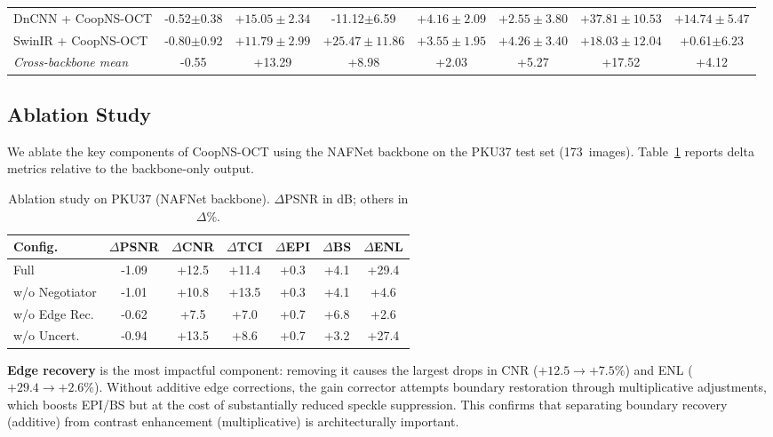 \documentclass{ieeetj}
\begin{document}
\begin{table}[t]
{\begin{tabular}{lccccccc}
DnCNN + CoopNS-OCT & -0.52${\pm}$0.38 & $\mathbf{+15.05{\pm}2.34}$ & -11.12${\pm}$6.59 & $\mathbf{+4.16{\pm}2.09}$ & $\mathbf{+2.55{\pm}3.80}$ & $\mathbf{+37.81{\pm}10.53}$ & $\mathbf{+14.74{\pm}5.47}$ \\
SwinIR + CoopNS-OCT & -0.80${\pm}$0.92 & $\mathbf{+11.79{\pm}2.99}$ & $\mathbf{+25.47{\pm}11.86}$ & $\mathbf{+3.55{\pm}1.95}$ & $\mathbf{+4.26{\pm}3.40}$ & $\mathbf{+18.03{\pm}12.04}$ & +0.61${\pm}$6.23 \\
\textit{Cross-backbone mean} & -0.55 & +13.29 & +8.98 & +2.03 & +5.27 & +17.52 & +4.12 \\
\bottomrule
\end{tabular}}
\end{table}

\subsection{Ablation Study}
\label{sec:ablation}

We ablate the key components of CoopNS-OCT using the NAFNet backbone on the PKU37 test set (173~images). Table~\ref{tab:ablation} reports delta metrics relative to the backbone-only output.

\begin{table}[t]
\centering
\caption{Ablation study on PKU37 (NAFNet backbone). $\Delta$PSNR in dB; others in $\Delta\%$.}
\label{tab:ablation}
\setlength{\tabcolsep}{2.5pt}
\footnotesize
\begin{tabular}{lcccccc}
\toprule
Config. & $\Delta$PSNR & $\Delta$CNR & $\Delta$TCI & $\Delta$EPI & $\Delta$BS & $\Delta$ENL \\
\midrule
Full & -1.09 & +12.5 & +11.4 & +0.3 & +4.1 & +29.4 \\
w/o Negotiator & -1.01 & +10.8 & +13.5 & +0.3 & +4.1 & +4.6 \\
w/o Edge Rec. & -0.62 & +7.5 & +7.0 & +0.7 & +6.8 & +2.6 \\
w/o Uncert. & -0.94 & +13.5 & +8.6 & +0.7 & +3.2 & +27.4 \\
\bottomrule
\end{tabular}
\end{table}

\textbf{Edge recovery} is the most impactful component: removing it causes the largest drops in CNR ($+12.5 \to +7.5\%$) and ENL ($+29.4 \to +2.6\%$). Without additive edge corrections, the gain corrector attempts boundary restoration through multiplicative adjustments, which boosts EPI/BS but at the cost of substantially reduced speckle suppression. This confirms that separating boundary recovery (additive) from contrast enhancement (multiplicative) is architecturally important.
\end{document}
